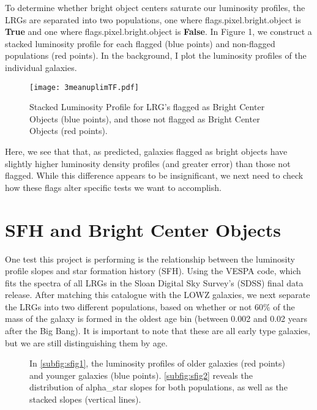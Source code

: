 \documentclass{article}
\begin{document}
To determine whether bright object centers saturate our luminosity profiles, the LRGs are separated into two populations, one where flags.pixel.bright.object is \textbf{True} and one where flags.pixel.bright.object is \textbf{False}. In Figure 1, we construct a stacked luminosity profile for each flagged (blue points) and non-flagged populations (red points). In the background, I plot the luminosity profiles of the individual galaxies.

\begin{figure}[t]
\centerline{\texttt{[image: 3meanuplimTF.pdf]}}
\caption{Stacked Luminosity Profile for LRG's flagged as Bright Center Objects (blue points), and those not flagged as Bright Center Objects (red points). }
\label{fig:mesh1}
\end{figure}

Here, we see that that, as predicted, galaxies flagged as bright objects have slightly higher luminosity density profiles (and greater error) than those not flagged. While this difference appears to be insignificant, we next need to check how these flags alter specific tests we want to accomplish.

\section{SFH and Bright Center Objects}
One test this project is performing is the relationship between the luminosity profile slopes and star formation history (SFH). Using the VESPA code, which fits the spectra of all LRGs in the Sloan Digital Sky Survey's (SDSS) final data release. After matching this catalogue with the LOWZ galaxies, we next separate the LRGs into two different populations, based on whether or not 60\% of the mass of the galaxy is formed in the oldest age bin (between 0.002 and 0.02 years after the Big Bang). It is important to note that these are all early type galaxies, but we are still distinguishing them by age.

\begin{figure}[h!]
\hfill
{}
 \caption{In \ref{subfig:sfig1}, the luminosity profiles of older galaxies (red points) and younger galaxies (blue points). \ref{subfig:sfig2} reveals the distribution of alpha\_star slopes for both populations, as well as the stacked slopes (vertical lines).}
\label{fig:mesh2}
\end{figure}
\end{document}
